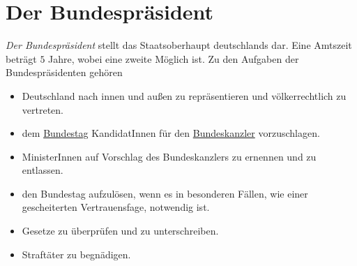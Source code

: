 \documentclass{article}
\begin{document}
\section{Der Bundespräsident} 
\emph{Der Bundespräsident} stellt das Staatsoberhaupt deutschlands dar. Eine Amtszeit beträgt $5$ Jahre, wobei eine zweite Möglich ist. 
Zu den Aufgaben der Bundespräsidenten gehören
\begin{itemize}
 \item Deutschland nach innen und außen zu repräsentieren und völkerrechtlich zu vertreten.
 \item dem \hyperref[Der Bundestag]{Bundestag} KandidatInnen für den \hyperref[Der Bundeskanzler]{Bundeskanzler} vorzuschlagen.
 \item MinisterInnen auf Vorschlag des Bundeskanzlers zu ernennen und zu entlassen.
 \item den Bundestag aufzulösen, wenn es in besonderen Fällen, wie einer gescheiterten Vertrauensfage, notwendig ist.
 \item Gesetze zu überprüfen und zu unterschreiben.
 \item Straftäter zu begnädigen. 
\end{itemize} 
\end{document}

